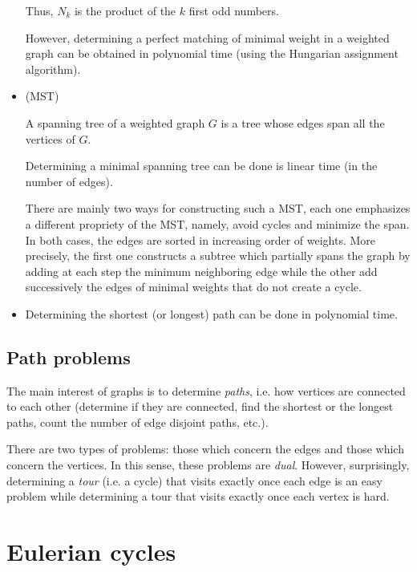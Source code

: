 \begin{itemize}
Thus, $N_k$ is the product of the $k$ first odd numbers. 

However, determining a perfect matching of minimal weight in a weighted graph can be obtained in polynomial time (using the Hungarian assignment algorithm). 

\item
{} (MST)

A spanning tree of a weighted graph $G$ is a tree whose edges span all the vertices of $G$.
\bigskip

Determining a minimal spanning tree can be done is linear time (in the number of edges).

There are mainly two ways for constructing such a MST, each one emphasizes a different propriety of the MST, namely, avoid cycles and minimize the span.
In both cases, the edges are sorted in increasing order of weights.
More precisely, the first one constructs a subtree which partially spans the graph by adding at each step the minimum neighboring edge 
while the other add successively the edges of minimal weights that do not create a cycle.
\item
{}

Determining the shortest (or longest) path can be done in polynomial time.
\end{itemize}



\subsection{Path problems}

The main interest of graphs is to determine \textit{paths}, i.e. how vertices are connected to each other (determine if they are connected, find the shortest or the longest paths, count the number of edge disjoint paths, etc.). 

There are two types of problems: those which concern the edges and those which concern the vertices. 
In this sense, these problems are \textit{dual}.
However, surprisingly, determining a \textit{tour} (i.e. a cycle) that visits exactly once each edge is an easy problem
 while determining a tour that visits exactly once each vertex is hard. 



\section{Eulerian cycles}
\label{sec:eulerianCycle}

